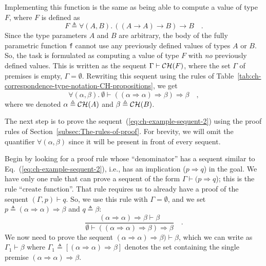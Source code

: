 \noindent Implementing this function is the same as being able to
compute a value of type $F$, where $F$ is defined as
\[
F\triangleq\forall(A,B).\,((A\rightarrow A)\rightarrow B)\rightarrow B\quad.
\]
Since the type parameters $A$ and $B$ are arbitrary, the body of
the fully parametric function \lstinline!f! cannot use any previously
defined values of types $A$ or $B$. So, the task is formulated as
computing a value of type $F$ with \emph{no} previously defined values.
This is written as the sequent $\Gamma\vdash{\cal CH}(F)$, where
the set $\Gamma$ of premises is empty, $\Gamma=\emptyset$. Rewriting
this sequent using the rules of Table~\ref{tab:ch-correspondence-type-notation-CH-propositions},
we get
\begin{equation}
\forall(\alpha,\beta).~\emptyset\vdash((\alpha\Rightarrow\alpha)\Rightarrow\beta)\Rightarrow\beta\quad,\label{eq:ch-example-sequent-2}
\end{equation}
where we denoted $\alpha\triangleq{\cal CH}(A)$ and $\beta\triangleq{\cal CH}(B)$. 

The next step is to prove the sequent~(\ref{eq:ch-example-sequent-2})
using the proof rules of Section~\ref{subsec:The-rules-of-proof}.
For brevity, we will omit the quantifier $\forall(\alpha,\beta)$
since it will be present in front of every sequent.

Begin by looking for a proof rule whose \textsf{``}denominator\textsf{''} has a sequent
similar to Eq.~(\ref{eq:ch-example-sequent-2}), i.e., has an implication
($p\Rightarrow q$) in the goal. We have only one rule that can prove
a sequent of the form $\Gamma\vdash(p\Rightarrow q$); this is the
rule \textsf{``}$\text{create function}$\textsf{''}. That rule requires us to already
have a proof of the sequent $(\Gamma,p)\vdash q$. So, we use this
rule with $\Gamma=\emptyset$, and we set $p\triangleq(\alpha\Rightarrow\alpha)\Rightarrow\beta$
and $q\triangleq\beta$: 
\[
\frac{(\alpha\Rightarrow\alpha)\Rightarrow\beta\vdash\beta}{\emptyset\vdash((\alpha\Rightarrow\alpha)\Rightarrow\beta)\Rightarrow\beta}\quad.
\]
We now need to prove the sequent $(\alpha\Rightarrow\alpha)\Rightarrow\beta)\vdash\beta$,
which we can write as $\Gamma_{1}\vdash\beta$ where $\Gamma_{1}\triangleq[(\alpha\Rightarrow\alpha)\Rightarrow\beta]$
denotes the set containing the single premise $(\alpha\Rightarrow\alpha)\Rightarrow\beta$. 

